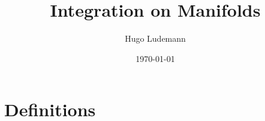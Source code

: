 \documentclass[20pt]{article}
\title{Integration on Manifolds}
\date{\today}
\author{Hugo Ludemann}
\theoremstyle{plain}
\newtheorem{theorem}{Theorem}
\theoremstyle{definition}
\newtheorem{definition}{Definition}
\newcommand{\reals}{\mathbb{R}}
\begin{document}
\maketitle



\section{Definitions}




\end{document}
